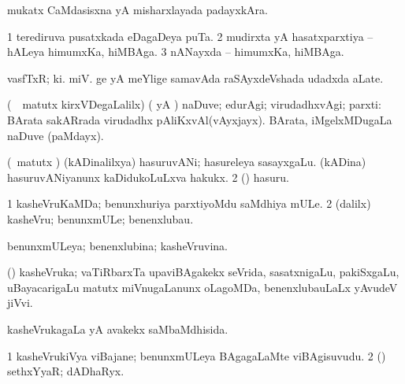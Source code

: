 \bentry
{} 
\gl{\nA}
\expl{\F\ }
\bmng
 mukatx CaMdasisxna yA misharxlayada padayxkAra. 
\emng
\eentry

\bentry
{} 
\gl{\nA}
\bmng
\bnum
\num{1} terediruva pusatxkada eDagaDeya puTa. 
\num{2} mudirxta yA hasatxparxtiya -- hALeya himumxKa, hiMBAga. 
\num{3} nANayxda -- himumxKa, hiMBAga. 
\enum
\emng
\eentry

\bentry
{} 
\gl{\nA}
\expl{}
\bmng
 vasfTxR;  ki. miV. ge yA  meYlige samavAda raSAyxdeVshada udadxda aLate. 
\emng
\eentry

\bentry
{} 
\gl{\upa}
\expl{}
\bmng
 (\kanmu\ \nAyxshA\ matutx kirxVDegaLalilx) (\saMkiSx {} yA ) naDuve; edurAgi; virudadhxvAgi; parxti:  BArata sakARrada virudadhx pAliKxvAl(vAyxjayx).  BArata, iMgelxMDugaLa naDuve (paMdayx). 
\emng
\eentry

\bentry
{} 
\gl{\nA}
\expl{}
\bmng
\bnum
{} (\nAyxshA\ matutx \ca) 
\banum
{} (kADinalilxya) hasuruvANi; hasureleya sasayxgaLu. 
 (kADina) hasuruvANiyanunx kaDidukoLuLxva hakukx. 
\eanum
\numie
\num{2} (\vaMlAM) hasuru. 
\enum
\emng
\eentry

\bentry
{} 
\gl{\nA}
\bmng
\bnum
\num{1} kasheVruKaMDa; benunxhuriya parxtiyoMdu saMdhiya mULe. 
\num{2} (\bava dalilx) kasheVru; benunxmULe; benenxlubau. 
\enum
\emng
\eentry

\bentry
{} 
\gl{\gu}
\expl{}
\bmng
 benunxmULeya; benenxlubina; kasheVruvina. 
\emng
\eentry

\bentry
{} 
\gl{\nA}
\expl{}
\bmng
 (\pArxvi) kasheVruka; vaTiRbarxTa upaviBAgakekx seVrida, sasatxnigaLu, pakiSxgaLu, uBayacarigaLu matutx miVnugaLanunx oLagoMDa, benenxlubauLaLx yAvudeV jiVvi. 
\emng
\eentry

\bentry
{} 
\gl{\gu}
\expl{}
\bmng
 kasheVrukagaLa yA avakekx saMbaMdhisida. 
\emng
\eentry

\bentry 
{} 
\gl{\nA}
\expl{}
\bmng
\bnum
\num{1} kasheVrukiVya viBajane; benunxmULeya BAgagaLaMte viBAgisuvudu. 
\num{2} (\rUpa) sethxYyaR; dADhaRyx. 
\enum
\emng
\eentry

